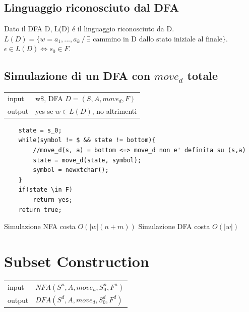 \subsection{Linguaggio riconosciuto dal DFA}
Dato il DFA D, L(D) \'e il linguaggio riconosciuto da D. \\
$L(D) = \{ w=a_1,...,a_k \ / \ \exists \text{ cammino in D dallo stato iniziale al finale}\}$.
$\epsilon \in L(D) \iff s_0 \in F$.

\subsection{Simulazione di un DFA con $move_d$ totale}
\begin{center}
    \begin{tabular}{ll}
        input & w$\$$, DFA $D=(S,A,move_d,F)$\\
        output & yes se $w \in L(D)$, no altrimenti\\
    \end{tabular}
\end{center}

\begin{lstlisting}
    state = s_0;
    while(symbol != $ && state != bottom){
        //move_d(s, a) = bottom <=> move_d non e' definita su (s,a)
        state = move_d(state, symbol);
        symbol = newxtchar();
    }
    if(state \in F)
        return yes;
    return true;
\end{lstlisting}

Simulazione NFA costa $O(|w|(n+m))$
Simulazione DFA costa $O(|w|)$

\section{Subset Construction}
\begin{center}
    \begin{tabular}{ll}
        input & $NFA(S^n,A,move_n, S_0 ^n,F^n)$\\ 
        output & $DFA(S^d,A,move_d, S_0 ^d,F^d)$\\
    \end{tabular}
\end{center}

